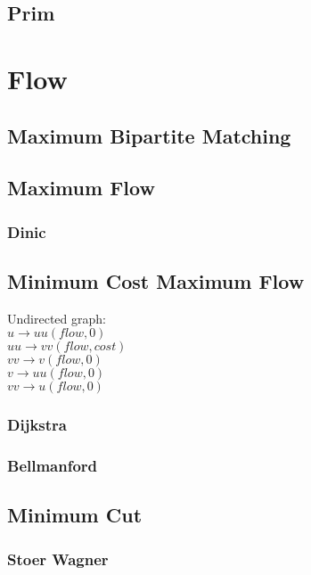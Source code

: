 \documentclass[10pt,a4paper]{report}
\begin{document}
		\subsection{Prim}
		
	\section{Flow}
		\subsection{Maximum Bipartite Matching}
			
		\newpage
		\subsection{Maximum Flow}
			\subsubsection{Dinic}
				
		\newpage
		\subsection{Minimum Cost Maximum Flow}
			Undirected graph:\\
			$u \rightarrow uu(flow, 0)$\\
			$uu \rightarrow vv(flow, cost)$\\
			$vv \rightarrow v(flow, 0)$\\
			$v \rightarrow uu(flow, 0)$\\
			$vv \rightarrow u(flow, 0)$
			\subsubsection{Dijkstra}
				
			\newpage
			\subsubsection{Bellmanford}
		\subsection{Minimum Cut}
			\subsubsection{Stoer Wagner}
				
	
\end{document}
